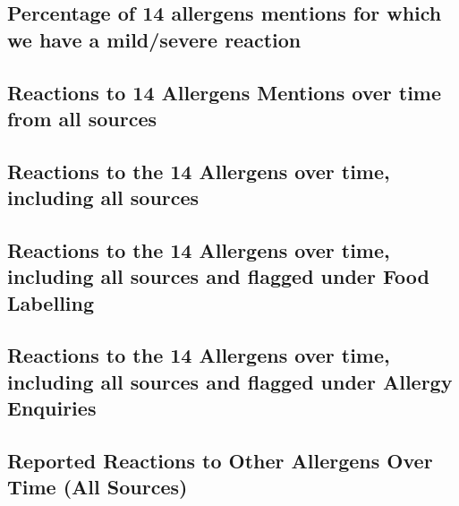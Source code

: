 \subsection{Percentage of 14 allergens mentions for which we have a mild/severe reaction}

\subsection{Reactions to 14 Allergens Mentions over time from all sources}

\subsection{Reactions to the 14 Allergens over time, including all sources}

\subsection{Reactions to the 14 Allergens over time, including all sources and flagged under Food Labelling}

\subsection{Reactions to the 14 Allergens over time, including all sources and flagged under Allergy Enquiries}

\subsection{Reported Reactions to Other Allergens Over Time (All Sources)}
